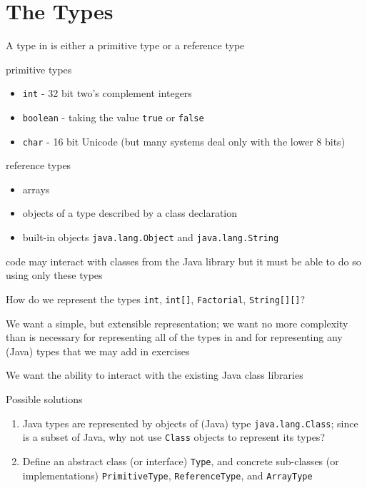\documentclass[8pt,a4paper,compress]{beamer}
\begin{document}
\section{The \protect\jmm Types}
\begin{frame}[fragile]
\pause

A type in \jmm is either a primitive type or a reference type

\pause
\bigskip

\jmm primitive types
\begin{itemize}
\item \lstinline{int} - 32 bit two's complement integers
\item \lstinline{boolean} - taking the value \lstinline{true} or \lstinline{false}
\item \lstinline{char} - 16 bit Unicode (but many systems deal only with the lower 8 bits)
\end{itemize}

\pause
\bigskip

\jmm reference types
\begin{itemize}
\item arrays
\item objects of a type described by a class declaration
\item built-in objects \lstinline{java.lang.Object} and \lstinline{java.lang.String}
\end{itemize}

\pause
\bigskip

\jmm code may interact with classes from the Java library but it must be able to do so using only these types
\end{frame}

\begin{frame}[fragile]
\pause

How do we represent the types \lstinline{int}, \lstinline{int[]}, \lstinline{Factorial}, \lstinline{String[][]}?  

\pause
\bigskip

We want a simple, but extensible representation; we want no more complexity than is necessary for representing all of the types in \jmm and for representing any (Java) types that we may add in exercises

\pause
\bigskip

We want the ability to interact with the existing Java class libraries

\pause
\bigskip

Possible solutions
\begin{enumerate}
\item Java types are represented by objects of (Java) type \lstinline{java.lang.Class}; since \jmm is a subset of Java, why not use \lstinline{Class} objects to represent its types? 
\item Define an abstract class (or interface) \lstinline{Type}, and concrete sub-classes (or implementations) \lstinline{PrimitiveType}, \lstinline{ReferenceType}, and \lstinline{ArrayType}
\end{enumerate}
\end{frame}
\end{document}
